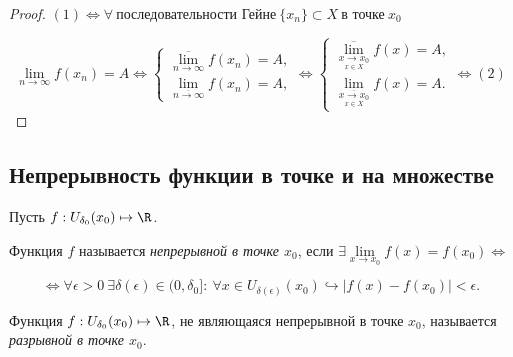 \begin{proof}
    $(1) \Leftrightarrow \forall \ \textrm{последовательности Гейне} \ \{x_{n}\} \subset X \  \textrm{в точке}\  x_{0}$

    $$
    \lim\limits_{n \to \infty} f(x_{n}) = A  \Leftrightarrow 
    \begin{cases}
        \overline{\lim\limits_{n \to \infty}} f(x_{n}) = A, \\
        \lim\limits_{\overline{n \to \infty}} f(x_{n}) = A,
    \end{cases}
    \Leftrightarrow 
    \begin{cases}
        \overline{\lim\limits_{\underset{x \in X}{x\to x_0}}} f(x) = A, \\
        \lim\limits_{\overline{\underset{x \in X}{x\to x_0}}} f(x) = A.
    \end{cases}
    \Leftrightarrow (2)$$
\end{proof}

\subsection{Непрерывность функции в точке и на множестве}

\begin{definition}
    Пусть $f: U_{\delta_{0}}(x_{0}) \mapsto \R$.

    Функция $f$ называется \textit{непрерывной в точке $x_{0}$}, если $\exists \lim\limits_{x \to x_{0}} f(x) = f(x_{0}) \Leftrightarrow$

    $$\Leftrightarrow
     \forall \epsilon > 0 \ \exists \delta(\epsilon) \in (0, \delta_{0}]: \ \forall x\in U_{\delta(\epsilon)}(x_{0}) \hookrightarrow |f(x) - f(x_{0})| < \epsilon.
    $$
\end{definition}

\begin{definition}
    Функция $f: U_{\delta_{0}}(x_{0}) \mapsto \R$, не являющаяся непрерывной в точке $x_0$, называется \textit{разрывной в точке $x_0$}.
\end{definition}

